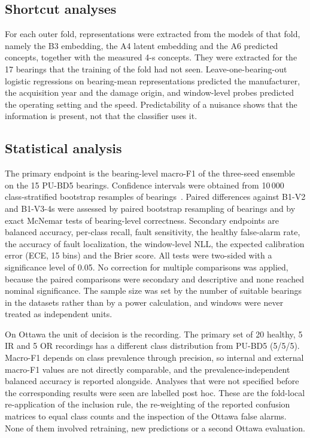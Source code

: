 \documentclass[10pt,letterpaper]{article}
\begin{document}
\subsection*{Shortcut analyses}
For each outer fold, representations were extracted from the models of that fold, namely the B3 embedding, the A4 latent embedding and the A6 predicted concepts, together with the measured 4-s concepts. They were extracted for the 17 bearings that the training of the fold had not seen. Leave-one-bearing-out logistic regressions on bearing-mean representations predicted the manufacturer, the acquisition year and the damage origin, and window-level probes predicted the operating setting and the speed. Predictability of a nuisance shows that the information is present, not that the classifier uses it.

\subsection*{Statistical analysis}
The primary endpoint is the bearing-level macro-F1 of the three-seed ensemble on the 15 PU-BD5 bearings. Confidence intervals were obtained from 10\,000 class-stratified bootstrap resamples of bearings~\cite{efron1993introduction}. Paired differences against B1-V2 and B1-V3-4s were assessed by paired bootstrap resampling of bearings and by exact McNemar tests of bearing-level correctness. Secondary endpoints are balanced accuracy, per-class recall, fault sensitivity, the healthy false-alarm rate, the accuracy of fault localization, the window-level NLL, the expected calibration error (ECE, 15 bins) and the Brier score. All tests were two-sided with a significance level of 0.05. No correction for multiple comparisons was applied, because the paired comparisons were secondary and descriptive and none reached nominal significance. The sample size was set by the number of suitable bearings in the datasets rather than by a power calculation, and windows were never treated as independent units.

On Ottawa the unit of decision is the recording. The primary set of 20 healthy, 5 IR and 5 OR recordings has a different class distribution from PU-BD5 (5/5/5). Macro-F1 depends on class prevalence through precision, so internal and external macro-F1 values are not directly comparable, and the prevalence-independent balanced accuracy is reported alongside. Analyses that were not specified before the corresponding results were seen are labelled post hoc. These are the fold-local re-application of the inclusion rule, the re-weighting of the reported confusion matrices to equal class counts and the inspection of the Ottawa false alarms. None of them involved retraining, new predictions or a second Ottawa evaluation.
\end{document}
